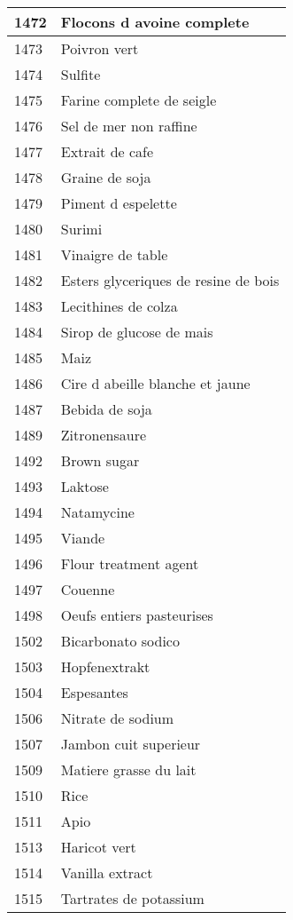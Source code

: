 \begin{longtable}{|l|l|}
1472 & Flocons d avoine complete \\ \hline 
1473 & Poivron vert \\ \hline 
1474 & Sulfite \\ \hline 
1475 & Farine complete de seigle \\ \hline 
1476 & Sel de mer non raffine \\ \hline 
1477 & Extrait de cafe \\ \hline 
1478 & Graine de soja \\ \hline 
1479 & Piment d espelette \\ \hline 
1480 & Surimi \\ \hline 
1481 & Vinaigre de table \\ \hline 
1482 & Esters glyceriques de resine de bois \\ \hline 
1483 & Lecithines de colza \\ \hline 
1484 & Sirop de glucose de mais \\ \hline 
1485 & Maiz \\ \hline 
1486 & Cire d abeille blanche et jaune \\ \hline 
1487 & Bebida de soja \\ \hline 
1489 & Zitronensaure \\ \hline 
1492 & Brown sugar \\ \hline 
1493 & Laktose \\ \hline 
1494 & Natamycine \\ \hline 
1495 & Viande \\ \hline 
1496 & Flour treatment agent \\ \hline 
1497 & Couenne \\ \hline 
1498 & Oeufs entiers pasteurises \\ \hline 
1502 & Bicarbonato sodico \\ \hline 
1503 & Hopfenextrakt \\ \hline 
1504 & Espesantes \\ \hline 
1506 & Nitrate de sodium \\ \hline 
1507 & Jambon cuit superieur \\ \hline 
1509 & Matiere grasse du lait \\ \hline 
1510 & Rice \\ \hline 
1511 & Apio \\ \hline 
1513 & Haricot vert \\ \hline 
1514 & Vanilla extract \\ \hline 
1515 & Tartrates de potassium \\ \hline 

\end{longtable}
